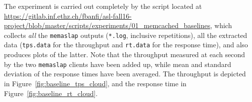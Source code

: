 \documentclass[11pt]{article}
\theoremstyle{definition}
\renewcommand\t\texttt
\begin{document}

The experiment is carried out completely by the script located at \url{https://gitlab.inf.ethz.ch/fbanfi/asl-fall16-project/blob/master/scripts/experiments/01_memcached_baselines}, which collects \emph{all} the \t{memaslap} outputs (\t{*.log}, inclusive repetitions), all the extracted data (\t{tps.data} for the throughput and \t{rt.data} for the response time), and also produces plots of the latter.
Note that the throughput measured at each second by the two \t{memaslap} clients have been added up, while mean and standard deviation of the response times have been averaged.
The throughput is depicted in Figure~\ref{fig:baseline_tps_cloud}, and the response time in Figure~\ref{fig:baseline_rt_cloud}.

\end{document}
